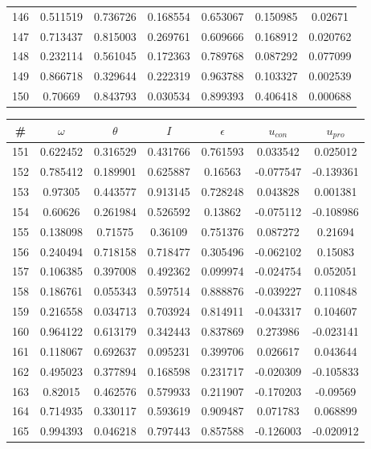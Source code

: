 \begin{table}
\begin{tabular}{c|c|c|c|c|c|c}
146 & 0.511519 & 0.736726 & 0.168554 & 0.653067 & 0.150985 & 0.02671\\
147 & 0.713437 & 0.815003 & 0.269761 & 0.609666 & 0.168912 & 0.020762\\
148 & 0.232114 & 0.561045 & 0.172363 & 0.789768 & 0.087292 & 0.077099\\
149 & 0.866718 & 0.329644 & 0.222319 & 0.963788 & 0.103327 & 0.002539\\
150 & 0.70669 & 0.843793 & 0.030534 & 0.899393 & 0.406418 & 0.000688\\
\end{tabular}
\end{table}
\newpage
\begin{table}
\begin{tabular}{c|c|c|c|c|c|c}
\# & $\omega$ & $\theta$ & $I$ & $\epsilon$ & $u_{con}$ & $u_{pro}$\\
\hline
151 & 0.622452 & 0.316529 & 0.431766 & 0.761593 & 0.033542 & 0.025012\\
152 & 0.785412 & 0.189901 & 0.625887 & 0.16563 & -0.077547 & -0.139361\\
153 & 0.97305 & 0.443577 & 0.913145 & 0.728248 & 0.043828 & 0.001381\\
154 & 0.60626 & 0.261984 & 0.526592 & 0.13862 & -0.075112 & -0.108986\\
155 & 0.138098 & 0.71575 & 0.36109 & 0.751376 & 0.087272 & 0.21694\\
156 & 0.240494 & 0.718158 & 0.718477 & 0.305496 & -0.062102 & 0.15083\\
157 & 0.106385 & 0.397008 & 0.492362 & 0.099974 & -0.024754 & 0.052051\\
158 & 0.186761 & 0.055343 & 0.597514 & 0.888876 & -0.039227 & 0.110848\\
159 & 0.216558 & 0.034713 & 0.703924 & 0.814911 & -0.043317 & 0.104607\\
160 & 0.964122 & 0.613179 & 0.342443 & 0.837869 & 0.273986 & -0.023141\\
161 & 0.118067 & 0.692637 & 0.095231 & 0.399706 & 0.026617 & 0.043644\\
162 & 0.495023 & 0.377894 & 0.168598 & 0.231717 & -0.020309 & -0.105833\\
163 & 0.82015 & 0.462576 & 0.579933 & 0.211907 & -0.170203 & -0.09569\\
164 & 0.714935 & 0.330117 & 0.593619 & 0.909487 & 0.071783 & 0.068899\\
165 & 0.994393 & 0.046218 & 0.797443 & 0.857588 & -0.126003 & -0.020912\\

\end{tabular}
\end{table}
